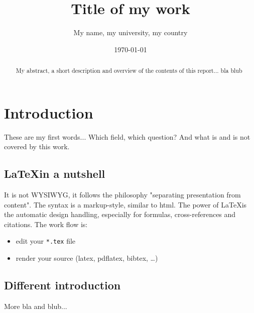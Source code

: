 \documentclass[12pt,oneside,notitlepage,abstracton,a4paper]{scrartcl}
\title{\Large Title of my work}
\author{\normalsize My name, my university, my country}
\date{\normalsize \today}
\begin{document}
\maketitle

\begin{abstract}
\noindent
My abstract, a short description and overview of the contents of this report... bla blub
\end{abstract}


\newpage

\tableofcontents
\newpage 

\section{Introduction}
\label{sec:intro}

These are my first words... Which field, which question? And what is and is not covered by this work.

\subsection{\LaTeX in a nutshell}
\label{sec:intro:detail}

It is not WYSIWYG, it follows the philosophy "separating presentation from content". 
The syntax is a markup-style, similar to html. 
The power of \LaTeX is the automatic design handling, especially for formulas, cross-references and citations.
The work flow is:
\begin{itemize}
\item edit your \texttt{*.tex} file
\item render your source (latex, pdflatex, bibtex, \dots)
\end{itemize}

\subsection{Different introduction}
\label{sec:intro:diff}

More bla and blub...
\end{document}
